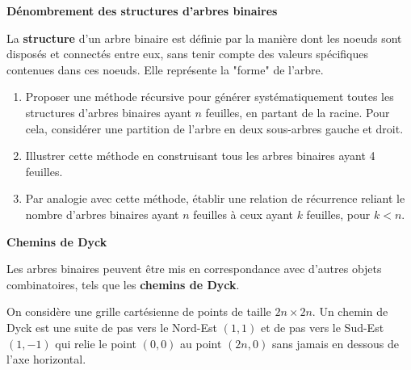 \documentclass[10pt,a4paper]{article}
\begin{document}
\q \textbf{Dénombrement des structures d'arbres binaires}

La \textbf{structure} d'un arbre binaire est définie par la manière dont les noeuds sont disposés et
connectés entre eux, sans tenir compte des valeurs spécifiques contenues dans ces noeuds. Elle
représente la "forme" de l'arbre.

\begin{enumerate}
    \item Proposer une méthode récursive pour générer systématiquement toutes les structures
    d'arbres binaires ayant \( n \) feuilles, en partant de la racine.
    Pour cela, considérer une partition de l'arbre en deux sous-arbres gauche et droit.
    \item Illustrer cette méthode en construisant tous les arbres binaires ayant 4 feuilles.
    \item Par analogie avec cette méthode, établir une relation de récurrence reliant le
    nombre d'arbres binaires ayant \( n \) feuilles à ceux ayant \( k \) feuilles, pour \( k < n \).
\end{enumerate}

\q \textbf{Chemins de Dyck}

Les arbres binaires peuvent être mis en correspondance avec d'autres objets combinatoires, tels que
les \textbf{chemins de Dyck}.

On considère une grille cartésienne de points de taille $2n \times 2n$. Un chemin de Dyck est une
suite de pas vers le Nord-Est $(1,1)$ et de pas vers le Sud-Est $(1,-1)$ qui relie le point $(0,0)$
au point $(2n,0)$ sans jamais en dessous de l'axe horizontal.


\end{document}
